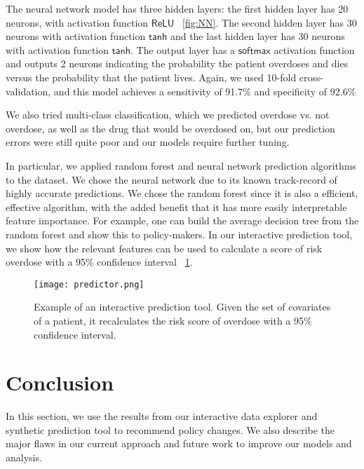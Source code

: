 \documentclass{article}
\begin{document}
The neural network model has three hidden layers: the first hidden layer has 20 neurons, with activation function $\mathsf{ReLU}$ ~\ref{fig:NN}. The second hidden layer has 30 neurons with activation function $\mathsf{tanh}$ and the last hidden layer has 30 neurons with activation function $\mathsf{tanh}$. The output layer has a $\mathsf{softmax}$ activation function and outputs 2 neurons indicating the probability the patient overdoses and dies versus the probability that the patient lives. Again, we used 10-fold cross-validation, and this model achieves a sensitivity of 91.7\% and specificity of 92.6\%

We also tried multi-class classification, which we predicted overdose vs. not overdose, as well as the drug that would be overdosed on, but our prediction errors were still quite poor and our models require further tuning.

In particular, we applied random forest and neural network prediction algorithms to the dataset. We chose the neural network due to its known track-record of highly accurate predictions. We chose the random forest since it is also a efficient, effective algorithm, with the added benefit that it has more easily interpretable feature importance. For example, one can build the average decision tree from the random forest and show this to policy-makers. In our interactive prediction tool, we show how the relevant features can be used to calculate a score of risk overdose with a 95\% confidence interval ~\ref{fig:predictor}.

\begin{figure}[h]
\centering
\texttt{[image: predictor.png]}
\caption{Example of an interactive prediction tool. Given the set of covariates of a patient, it recalculates the risk score of overdose with a 95\% confidence interval.}
\label{fig:predictor}
\end{figure}

\section{Conclusion}
In this section, we use the results from our interactive data explorer and synthetic prediction tool to recommend policy changes. We also describe the major flaws in our current approach and future work to improve our models and analysis.
\end{document}
